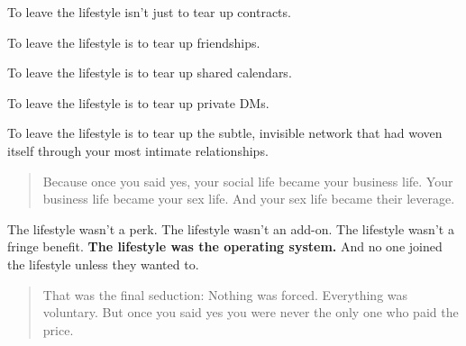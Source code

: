 To leave the lifestyle isn’t just to tear up contracts.

To leave the lifestyle is to tear up friendships.  

To leave the lifestyle is to tear up shared calendars.  

To leave the lifestyle is to tear up private DMs.  

To leave the lifestyle is to tear up the subtle, invisible network that had woven itself through your 
most intimate relationships.

\begin{quote}
Because once you said yes,  
your social life became your business life.  
Your business life became your sex life.  
And your sex life became their leverage.
\end{quote}

The lifestyle wasn’t a perk.
The lifestyle wasn’t an add-on.
The lifestyle wasn’t a fringe benefit.
\textbf{The lifestyle was the operating system.}
And no one joined the lifestyle unless they wanted to.

\begin{quote}
That was the final seduction:  
Nothing was forced.  
Everything was voluntary.  
But once you said yes  
you were never the only one who paid the price.
\end{quote}


